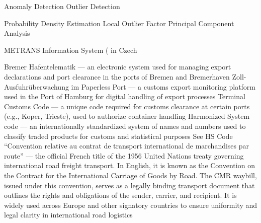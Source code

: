  {Anomaly Detection}
 {Outlier Detection}

 {Probability Density Estimation}
 {Local Outlier Factor}
 {Principal Component Analysis}

 {METRANS Information System ( in Czech}

 {Bremer Hafentelematik — an electronic system used for managing export declarations and port clearance in the ports of Bremen and Bremerhaven}
 {Zoll-Ausfuhrüberwachung im Paperless Port — a customs export monitoring platform used in the Port of Hamburg for digital handling of export processes}
 {Terminal Customs Code — a unique code required for customs clearance at certain ports (e.g., Koper, Trieste), used to authorize container handling}
 {Harmonized System code — an internationally standardized system of names and numbers used to classify traded products for customs and statistical purposes}
 {See HS Code}
 {``Convention relative au contrat de transport international de marchandises par route'' — the official French title of the 1956 United Nations treaty governing international road freight transport. In English, it is known as the Convention on the Contract for the International Carriage of Goods by Road. The CMR waybill, issued under this convention, serves as a legally binding transport document that outlines the rights and obligations of the sender, carrier, and recipient. It is widely used across Europe and other signatory countries to ensure uniformity and legal clarity in international road logistics}



